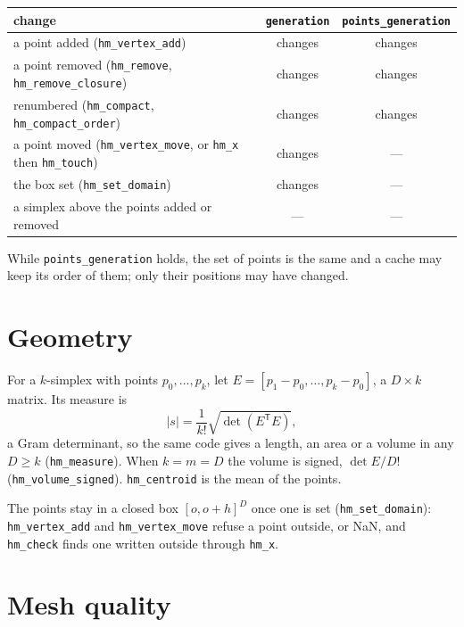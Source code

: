 \documentclass[10pt,a4paper]{article}
\theoremstyle{definition}
\newcommand{\fn}[1]{\texttt{#1}}
\begin{document}
\begin{center}
\begin{tabular}{@{}lcc@{}}
  \toprule
  change & \fn{generation} & \fn{points\_generation} \\
  \midrule
  a point added (\fn{hm\_vertex\_add}) & changes & changes \\
  a point removed (\fn{hm\_remove}, \fn{hm\_remove\_closure}) & changes & changes \\
  renumbered (\fn{hm\_compact}, \fn{hm\_compact\_order}) & changes & changes \\
  a point moved (\fn{hm\_vertex\_move}, or \fn{hm\_x} then \fn{hm\_touch}) & changes & --- \\
  the box set (\fn{hm\_set\_domain}) & changes & --- \\
  a simplex above the points added or removed & --- & --- \\
  \bottomrule
\end{tabular}
\end{center}

While \fn{points\_generation} holds, the set of points is the same and a
cache may keep its order of them; only their positions may have changed.

\section{Geometry}
\label{sec:geometry}

For a $k$-simplex with points $p_0, \ldots, p_k$, let $E = [p_1 - p_0,
\ldots, p_k - p_0]$, a $D \times k$ matrix. Its measure is
\[
  |s| = \frac{1}{k!} \sqrt{\det \left( E^{\mathsf T} E \right)},
\]
a Gram determinant, so the same code gives a length, an area or a volume in
any $D \ge k$ (\fn{hm\_measure}). When $k = m = D$ the volume is signed,
$\det E / D!$ (\fn{hm\_volume\_signed}). \fn{hm\_centroid} is the mean of
the points.

The points stay in a closed box $[o, o + h]^D$ once one is set
(\fn{hm\_set\_domain}): \fn{hm\_vertex\_add} and \fn{hm\_vertex\_move}
refuse a point outside, or NaN, and \fn{hm\_check} finds one written outside
through \fn{hm\_x}.

\section{Mesh quality}
\label{sec:quality}
\end{document}
